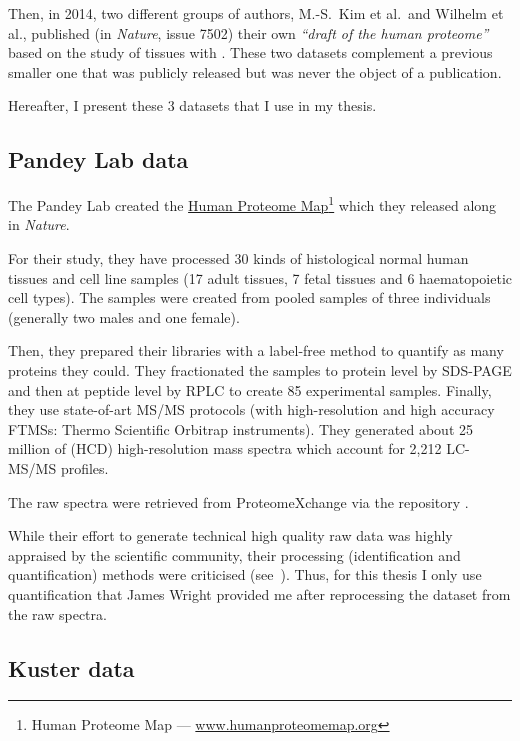 Then, in 2014, two different groups of authors, M.-S.\ Kim et al.\
and Wilhelm et al., published (in \textit{Nature},
issue 7502) their own \emph{``draft of the human proteome''}
based on the study of tissues with \ms. These two datasets complement a previous
smaller one that was publicly released but was never the object of a publication.

Hereafter, I present these 3 datasets that I use in my thesis.

\subsection{Pandey Lab data}

The Pandey Lab \citep{PandeyData} created the
\href{http://www.humanproteomemap.org/}%
{Human Proteome Map}\footnote{Human Proteome Map --- %
\href{http://www.humanproteomemap.org/}{www.humanproteomemap.org}} which
they released along \paper{\citetitle{PandeyData}} in \emph{Nature}.

For their study, they have processed 30 kinds of histological normal human
tissues and cell line samples (17 adult tissues, 7 fetal tissues and 6
haematopoietic cell types). The samples were created from pooled samples of three
individuals (generally two males and one female).

Then, they prepared their libraries with a label-free method to quantify
as many proteins they could. They fractionated the samples to protein level by
\gls{SDS-PAGE} and then at peptide level by \gls{RPLC} to create 85 experimental
samples. Finally, they use state-of-art \gls{MS/MS} protocols
(with high-resolution and high accuracy \glspl{FTMS}:
Thermo Scientific Orbitrap instruments).
They generated about 25 million of (\gls{HCD})
high-resolution mass spectra which account for 2,212 \gls{LC-MS/MS} profiles.

The raw spectra were retrieved from ProteomeXchange via the repository
\Pride{PXD000561}.

While their effort to generate technical high quality raw data was highly
appraised by the scientific community, their processing
(identification and quantification) methods were
criticised (see~\cite{Ezkurdia2014-qx}). Thus, for this thesis I only use
quantification that James Wright provided me after reprocessing the dataset
from the raw spectra.

\subsection{Kuster data}

